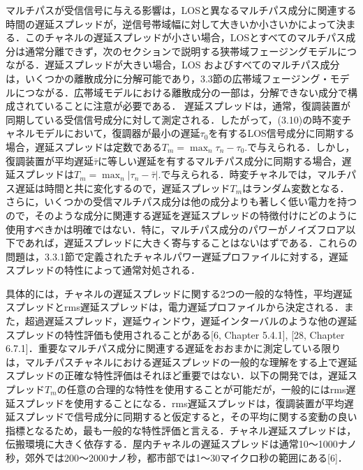 \documentclass[dvipdfmx]{jsarticle}
\begin{document}
マルチパスが受信信号に与える影響は，LOSと異なるマルチパス成分に関連する時間の遅延スプレッドが，逆信号帯域幅に対して大きいか小さいかによって決まる．このチャネルの遅延スプレッドが小さい場合，LOSとすべてのマルチパス成分は通常分離できず，次のセクションで説明する狭帯域フェージングモデルにつながる．遅延スプレッドが大きい場合，LOS およびすべてのマルチパス成分は，いくつかの離散成分に分解可能であり，3.3節の広帯域フェージング・モデルにつながる．広帯域モデルにおける離散成分の一部は，分解できない成分で構成されていることに注意が必要である．
遅延スプレッドは，通常，復調装置が同期している受信信号成分に対して測定される．したがって，(3.10)の時不変チャネルモデルにおいて，復調器が最小の遅延$\tau_0$を有するLOS信号成分に同期する場合，遅延スプレッドは定数である$T_m = \max_n \tau_n - \tau_0.$で与えられる．しかし，復調装置が平均遅延$\bar{\tau}$に等しい遅延を有するマルチパス成分に同期する場合，遅延スプレッドは$T_m = \max_n |\tau_n - \bar{\tau}|.$で与えられる．時変チャネルでは，マルチパス遅延は時間と共に変化するので，遅延スプレッド$T_m$はランダム変数となる．さらに，いくつかの受信マルチパス成分は他の成分よりも著しく低い電力を持つので，そのような成分に関連する遅延を遅延スプレッドの特徴付けにどのように使用すべきかは明確ではない．特に，マルチパス成分のパワーがノイズフロア以下であれば，遅延スプレッドに大きく寄与することはないはずである．これらの問題は，3.3.1節で定義されたチャネルパワー遅延プロファイルに対する，遅延スプレッドの特性によって通常対処される．

具体的には，チャネルの遅延スプレッドに関する2つの一般的な特性，平均遅延スプレッドとrms遅延スプレッドは，電力遅延プロファイルから決定される．また，超過遅延スプレッド，遅延ウィンドウ，遅延インターバルのような他の遅延スプレッドの特性評価も使用されることがある[6, Chapter 5.4.1], [28, Chapter 6.7.1]．重要なマルチパス成分に関連する遅延をおおまかに測定している限りは，マルチパスチャネルにおける遅延スプレッドの一般的な理解をする上で遅延スプレッドの正確な特性評価はそれほど重要ではない．以下の開発では，遅延スプレッド$T_m$の任意の合理的な特性を使用することが可能だが，一般的にはrms遅延スプレッドを使用することになる．rms遅延スプレッドは，復調装置が平均遅延スプレッドで信号成分に同期すると仮定すると，その平均に関する変動の良い指標となるため，最も一般的な特性評価と言える．チャネル遅延スプレッドは，伝搬環境に大きく依存する．屋内チャネルの遅延スプレッドは通常10～1000ナノ秒，郊外では200～2000ナノ秒，都市部では1～30マイクロ秒の範囲にある[6]．
\end{document}
